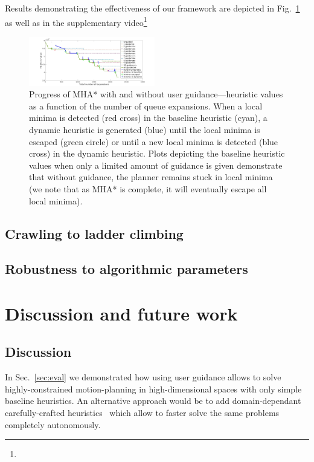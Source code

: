 \documentclass[conference]{IEEEtran}
\begin{document}
Results demonstrating the effectiveness of our framework are depicted in Fig.~\ref{fig:res}
as well as in the supplementary video\footnote{
}
\begin{figure}[tb]
  \centering
  	\includegraphics[width=0.49\textwidth, trim={5cm 0 5cm 0},clip]{fig/h_staircase.jpg}
  	\vspace{-2mm}
  \caption{
		Progress of MHA* with and without user guidance---heuristic values as a function of the number of queue expansions.
		When a local minima is detected (red cross) in the baseline heuristic (cyan), a dynamic heuristic is generated (blue) until the local minima is escaped (green circle) or until a new local minima is detected (blue cross) in the dynamic heuristic.
		Plots depicting the baseline heuristic values when only a limited amount of guidance is given demonstrate that without guidance, the planner remains stuck in local minima (we note that as MHA* is complete, it will eventually escape all local minima).
		}
\vspace{-5mm}
   	\label{fig:res}
\end{figure}

\subsection{Crawling to ladder climbing}


\subsection{Robustness to algorithmic parameters}
\section{Discussion and future work}
\label{sec:future}

\subsection{Discussion}
In Sec.~\ref{sec:eval} we demonstrated how using user guidance allows to solve highly-constrained motion-planning in high-dimensional spaces with only simple baseline heuristics.
An alternative approach would be to add domain-dependant carefully-crafted heuristics~\cite{V17} which allow to faster solve the same problems completely autonomously.
\end{document}

